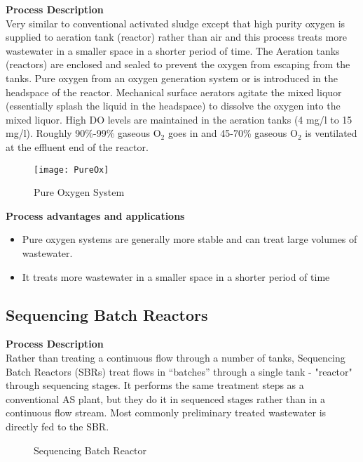 \noindent \textbf{Process Description}\\
\noindent Very similar to conventional activated sludge except that high purity oxygen is supplied to aeration tank (reactor) rather than air and this process treats more wastewater in a smaller space in a shorter period of time.  The Aeration tanks (reactors) are enclosed and sealed to prevent the oxygen from escaping from the tanks.  Pure oxygen from an oxygen generation system or is introduced in the headspace of the reactor.  Mechanical surface aerators agitate the mixed liquor (essentially splash the liquid in the headspace) to dissolve the oxygen into the mixed liquor.  High DO levels are maintained in the aeration tanks (4 mg/l to 15 mg/l).  Roughly 90\%-99\% gaseous O$_2$ goes in and 45-70\% gaseous O$_2$ is ventilated at the effluent end of the reactor.\\

\begin{figure}[h!]
\begin{center}
\texttt{[image: PureOx]}
\caption{Pure Oxygen System}
\end{center}
\end{figure}

\noindent \textbf{Process advantages and applications}
\begin{itemize}
\item 
Pure oxygen systems are generally more stable and can treat large volumes of wastewater.  
\item It treats more wastewater in a smaller space in a shorter period of time
\end{itemize}



\subsection{Sequencing Batch Reactors}

\noindent \textbf{Process Description}\\
\noindent Rather than treating a continuous flow through a number of tanks, Sequencing Batch Reactors (SBRs) treat flows in “batches” through a single tank - "reactor" through sequencing stages.  It performs the same treatment steps as a conventional AS plant, but they do it in sequenced stages rather than in a continuous flow stream.  Most commonly preliminary treated wastewater is directly fed to the SBR.

\begin{figure}[h!]
\begin{center}
\caption{Sequencing Batch Reactor}
\end{center}
\end{figure}


